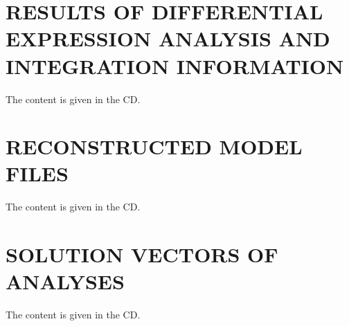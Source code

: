 \documentclass[a4paper,onesided,12pt]{report}
\begin{document}
\appendix

\chapter[RESULTS OF DIFFERENTIAL EXPRESSION ANALYSIS \\
	\hspace*{2.95cm} AND INTEGRATION INFORMATION]{RESULTS OF DIFFERENTIAL EXPRESSION ANALYSIS AND INTEGRATION INFORMATION}
The content is given in the CD.

\chapter[RECONSTRUCTED MODEL FILES]{RECONSTRUCTED MODEL FILES}
The content is given in the CD.

\chapter[SOLUTION VECTORS OF ANALYSES]{SOLUTION VECTORS OF ANALYSES}
The content is given in the CD.
\end{document}
